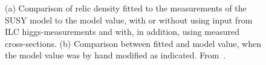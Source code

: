 \begin{figure}[]
   \centering
      \hspace{0.1\linewidth}
\caption{ (a) Comparison  of  relic   density  fitted to  the   measurements of the SUSY model
to the model value, with or without using input from ILC higgs-measurements and with, in addition, using 
measured cross-sections. (b) Comparison between fitted and model value, when the model value was by hand modified as indicated.
From~\cite{Lehtinen:415433}. \label{fig:searches_STC10omega}}
\end{figure}


